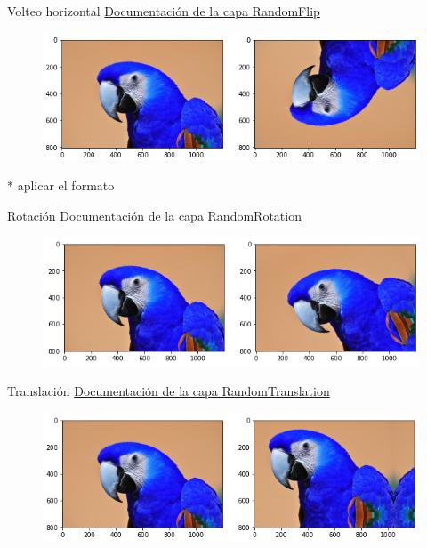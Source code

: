 \begin{frame}{Volteo horizontal}
\textcolor{blue}{\href{https://keras.io/api/layers/preprocessing_layers/image_augmentation/random_flip/}{Documentación de la capa RandomFlip}}
\begin{figure}
    \centering
    \includegraphics[width=\textwidth]{Slides/figures/Tema 3/VerFlip.png}
\end{figure}

* aplicar el formato 
\end{frame}

\begin{frame}{Rotación}
\textcolor{blue}{\href{https://keras.io/api/layers/preprocessing_layers/image_augmentation/random_rotation/}{Documentación de la capa RandomRotation}}
\begin{figure}
    \centering
    \includegraphics[width=\textwidth]{Slides/figures/Tema 3/Rotation.png}
\end{figure}
\end{frame}

\begin{frame}{Translación}
\textcolor{blue}{\href{https://keras.io/api/layers/preprocessing_layers/image_augmentation/random_translation/}{Documentación de la capa RandomTranslation}}
\begin{figure}
    \centering
    \includegraphics[width=\textwidth]{Slides/figures/Tema 3/Translation.png}
\end{figure}
\end{frame}

